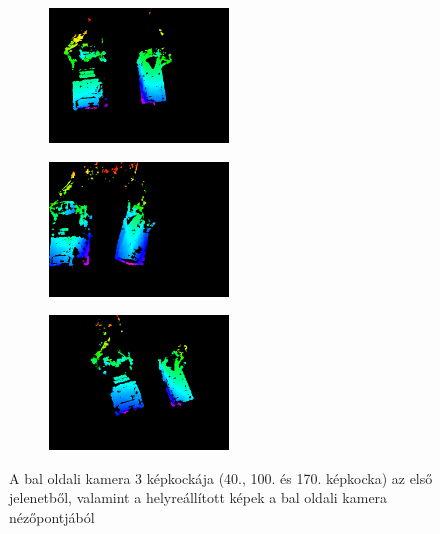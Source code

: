 \begin{figure}[t!]
\begin{subfigure}[b]{.32\linewidth}
	\centering
	\includegraphics[width=135pt]{figures/vis_93.png}
  \end{subfigure}
\begin{subfigure}[b]{.32\linewidth}
	\centering
	\includegraphics[width=135pt]{figures/vis_153.png}
  \end{subfigure}
\begin{subfigure}[b]{.32\linewidth}
	\centering
	\includegraphics[width=135pt]{figures/vis_223.png}
  \end{subfigure}
\caption{A bal oldali kamera 3 képkockája (40., 100. és 170. képkocka) az első jelenetből, valamint a helyreállított képek a bal oldali kamera nézőpontjából \label{fig:scene1_frames}}

\vspace{10pt}


\end{figure}

